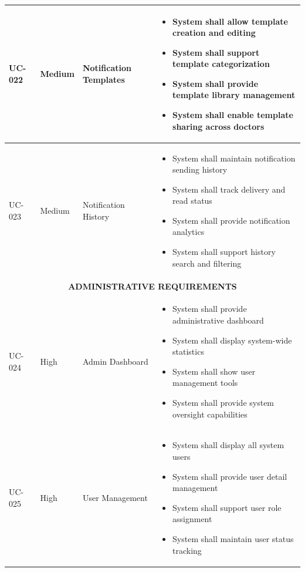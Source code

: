 \documentclass[12pt,a4paper]{article}
\begin{document}
\begin{longtable}{|p{1.2cm}|p{2.5cm}|p{3.5cm}|p{6.8cm}|}
\hline
UC-022 & Medium & Notification Templates & 
\begin{itemize}[leftmargin=*,topsep=1pt,partopsep=0pt,parsep=0pt,itemsep=1pt]
\item System shall allow template creation and editing
\item System shall support template categorization
\item System shall provide template library management
\item System shall enable template sharing across doctors
\end{itemize} \\
\hline
UC-023 & Medium & Notification History & 
\begin{itemize}[leftmargin=*,topsep=1pt,partopsep=0pt,parsep=0pt,itemsep=1pt]
\item System shall maintain notification sending history
\item System shall track delivery and read status
\item System shall provide notification analytics
\item System shall support history search and filtering
\end{itemize} \\
\hline
\multicolumn{4}{|c|}{\textbf{ADMINISTRATIVE REQUIREMENTS}} \\
\hline
UC-024 & High & Admin Dashboard & 
\begin{itemize}[leftmargin=*,topsep=1pt,partopsep=0pt,parsep=0pt,itemsep=1pt]
\item System shall provide administrative dashboard
\item System shall display system-wide statistics
\item System shall show user management tools
\item System shall provide system oversight capabilities
\end{itemize} \\
\hline
UC-025 & High & User Management & 
\begin{itemize}[leftmargin=*,topsep=1pt,partopsep=0pt,parsep=0pt,itemsep=1pt]
\item System shall display all system users
\item System shall provide user detail management
\item System shall support user role assignment
\item System shall maintain user status tracking
\end{itemize} \\

\end{longtable}
\end{document}
